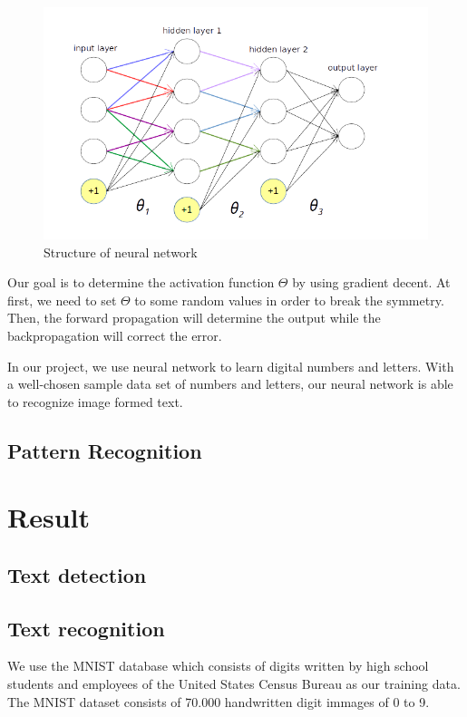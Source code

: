 \documentclass[paper=a4, french, 11pt]{scrartcl}
\begin{document}
\begin{figure}[h]
\begin{center}
	\vspace{-3ex}
   \includegraphics[width=0.75\linewidth]{network.png}
\end{center}
\vspace{-4ex}
\caption{Structure of neural network}
\label{fig:heatmap}
\end{figure}

Our goal is to determine the activation function $\Theta$ by using gradient decent. At first, we need to set $\Theta$ to some random values in order to break the symmetry. Then, the forward propagation will determine the output while the backpropagation will correct the error.

In our project, we use neural network to learn digital numbers and letters. With a well-chosen sample data set of numbers and letters, our neural network is able to recognize image formed text.
\subsection{Pattern Recognition}

\section{Result}
\subsection{Text detection}
\subsection{Text recognition}
We use the MNIST database which consists of digits written by high school students and employees of the United States Census Bureau as our training data. The MNIST dataset consists of 70.000 handwritten digit immages of 0 to 9.
\end{document}

